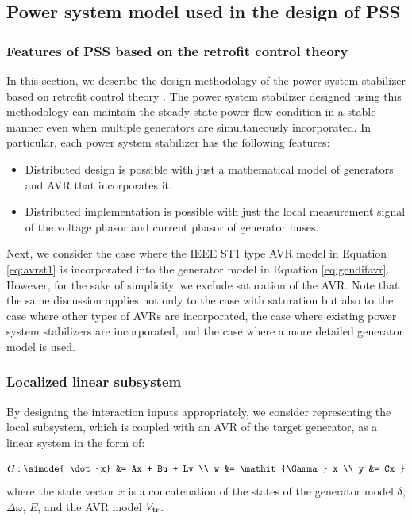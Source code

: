\documentclass[graybox, envcountchap]{svmult}
\begin{document}
\subsection{Power system model used in the design of PSS}

\smallskip
\subsubsection{Features of PSS based on the retrofit control theory}

In this section, we describe the design methodology of the power system
stabilizer based on retrofit control theory
\cite{ishizaki2018retrofit,sadamoto2018retrofit,sasahara2019damping,ishizaki2019retrofit,ishizaki2021modularity}.
The power system stabilizer designed using this methodology can maintain the
steady-state power flow condition in a stable manner even when multiple
generators are simultaneously incorporated. In particular, each power system
stabilizer has the following features:

\begin{itemize}
\item Distributed design is possible with just a mathematical model of generators and AVR that incorporates it.
\item Distributed implementation is possible with just the local measurement signal of the voltage phasor and current phasor of generator buses.
\end{itemize}

Next, we consider the case where the IEEE ST1 type AVR model in Equation
\ref{eq:avrst1} is incorporated into the generator model in Equation
\ref{eq:gendifavr}. However, for the sake of simplicity, we exclude saturation
of the AVR. Note that the same discussion applies not only to the case with
saturation but also to the case where other types of AVRs are incorporated, the
case where existing power system stabilizers are incorporated, and the case
where a more detailed generator model is used.

\smallskip
\subsubsection{Localized linear subsystem}
By designing the interaction inputs appropriately, we consider representing the
local subsystem, which is coupled with an AVR of the target generator, as a
linear system in the form of:

\begin{equation}\label{eq:desmodl}
  G:\simode{
  \dot{x} &= Ax + Bu + Lv \\
  w &= \mathit{\Gamma} x \\
  y &= Cx
  }
\end{equation}
where the state vector $x$ is a concatenation of the states of the generator
model $\delta$, $\Delta \omega$, $E$, and the AVR model $V_{\rm tr}$.
\end{document}
